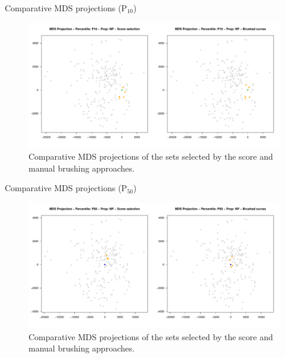\documentclass{beamer}
\begin{document}
\begin{frame}{Comparative MDS projections (P$_{10}$)}
  \begin{figure}[H]
    \centering
    \includegraphics[width=\columnwidth]{figures/mds-brush-score-p10.pdf}
    \caption{Comparative MDS projections of the sets selected by the score and manual brushing approaches.}
    \label{fig:mds-plots}
  \end{figure}
\end{frame}

\begin{frame}{Comparative MDS projections (P$_{50}$)}
  \begin{figure}[H]
    \centering
    \includegraphics[width=\columnwidth]{figures/mds-brush-score-p50.pdf}
    \caption{Comparative MDS projections of the sets selected by the score and manual brushing approaches.}
    \label{fig:mds-plots}
  \end{figure}
\end{frame}
\end{document}
